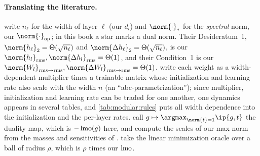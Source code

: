 \begin{refsection}
\paragraph{Translating the literature.} \Textcite{YangSimonBernstein2023} write $n_\ell$ for the width of layer $\ell$ (our $d_l$) and $\norm{\cdot}_*$ for the \emph{spectral} norm, our $\norm{\cdot}_{\op}$; in this book a star marks a dual norm. Their Desideratum~1, $\norm{h_\ell}_2=\Theta(\sqrt{n_\ell})$ and $\norm{\Delta h_\ell}_2=\Theta(\sqrt{n_\ell})$, is our $\norm{h_l}_\rms,\norm{\Delta h_l}_\rms=\Theta(1)$, and their Condition~1 is our $\norm{W_l}_{\rms\to\rms},\norm{\Delta W_l}_{\rms\to\rms}=\Theta(1)$. \Textcite{YangHu2021} write each weight as a width-dependent multiplier times a trainable matrix whose initialization and learning rate also scale with the width $n$ (an ``abc-parametrization''); since multiplier, initialization and learning rate can be traded for one another, one dynamics appears in several tables, and \cref{tab:modular:rules} puts all width dependence into the initialization and the per-layer rates. \Textcite{BernsteinNewhouse2025} call $g\mapsto\argmax_{\norm{t}=1}\ip{g,t}$ the duality map, which is $-\operatorname{lmo}(g)$ here, and compute the scales of our max norm from the masses and sensitivities of \textcite{LargeEtAl2024}. \Textcite{PethickEtAl2025} take the linear minimization oracle over a ball of radius $\rho$, which is $\rho$ times our $\operatorname{lmo}$.

\printchapterbib
\end{refsection}
